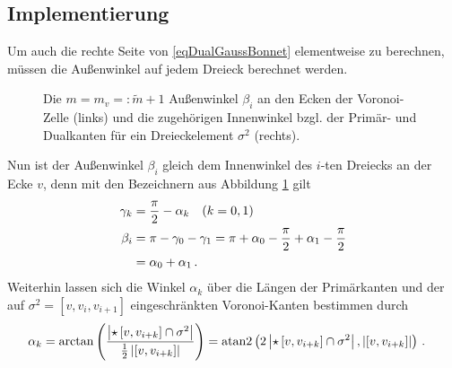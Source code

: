   \subsection{Implementierung}
    Um auch die rechte Seite von \eqref{eqDualGaussBonnet} elementweise zu berechnen, müssen die Außenwinkel auf jedem Dreieck berechnet
    werden.
    \begin{figure}
      \begin{minipage}[t]{0.49\textwidth}
        \centering
      \end{minipage}
      \hfill
      \begin{minipage}[t]{0.49\textwidth}
        \centering
      \end{minipage}
      \caption[Außenwinkel der Voronoi-Zelle]{Die \( m = m_{v} =: \tilde{m}+1 \) Außenwinkel \( \beta_{i} \) an den Ecken der
                                             Voronoi-Zelle (links) 
                                             und die zugehörigen Innenwinkel bzgl. der Primär- und Dualkanten für ein Dreieckelement 
                                             \( \sigma^{2} \) (rechts).}
      \label{figGaussBonnetWinkel}
    \end{figure}
    Nun ist der Außenwinkel \( \beta_{i} \) gleich dem Innenwinkel des \( i \)-ten Dreiecks an der Ecke \( v \), denn mit den Bezeichnern
    aus Abbildung \ref{figGaussBonnetWinkel} gilt
    \begin{align}
      \gamma_{k} &= \frac{\pi}{2} - \alpha_{k} \quad (k = 0,1) \\
      \beta_{i} &= \pi - \gamma_{0} - \gamma_{1}
                 = \pi + \alpha_{0} - \frac{\pi}{2} + \alpha_{1} - \frac{\pi}{2} \\
                &= \alpha_{0} + \alpha_{1} \,\text{.}
    \end{align}
    Weiterhin lassen sich die Winkel \( \alpha_{k} \) über die Längen der Primärkanten und der auf
    \mbox{\( \sigma^{2}=\left[ v, v_{i}, v_{i+1} \right] \)} eingeschränkten Voronoi-Kanten bestimmen durch
    \begin{align}
      \alpha_{k} &= \arctan\left( \frac{\left|\star\left[ v, v_{i+k} \right] \cap \sigma^{2} \right|}
                                    {\frac{1}{2}\left|\left[ v, v_{i+k} \right]\right|} \right)
                  = \text{atan2}\left( 2\left|\star\left[ v, v_{i+k} \right] \cap \sigma^{2} \right|, 
                                 \left|\left[ v, v_{i+k} \right]\right|\right) \,\text{.}
    \end{align}

